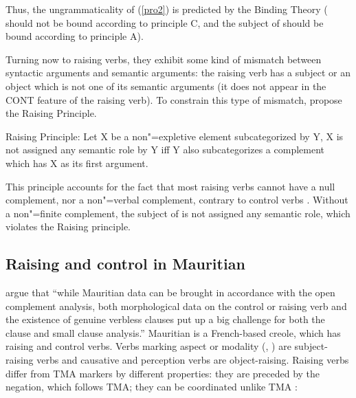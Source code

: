 \documentclass[output=paper
                ,modfonts
                ,nonflat
	        ,collection
	        ,collectionchapter
	        ,collectiontoclongg
 	        ,biblatex
                ,babelshorthands
                ,newtxmath
                ,draftmode
                ,colorlinks, citecolor=brown
]{./langsci/langscibook}
\begin{document}
\eal
{}
\zl

Thus, the ungrammaticality of (\ref{pro2}) is predicted by the Binding Theory ( should not be bound according to principle C, and the subject of  should be bound according to principle A).

Turning now to raising verbs, they exhibit some kind of mismatch between syntactic arguments and
semantic arguments: the raising verb has a subject or an object which is not one of its semantic
arguments (it does not appear in the CONT feature of the raising verb). To constrain this type of
mismatch, \citet[140]{PollardandSag1994} propose the Raising Principle.

\begin{exe}
\ex Raising Principle: Let X be a non"=expletive element subcategorized by Y, X is not assigned any semantic role by Y iff Y also subcategorizes a complement which has X as its first argument.
\end{exe}

This principle accounts for the fact  that most raising verbs cannot have a null complement, nor a non"=verbal complement, contrary to control verbs \citep{Jacobson1990}. Without a non"=finite complement, the subject of  is not assigned any semantic role, which violates the Raising principle.

\eal
{}
\zl


\subsection{Raising and control in Mauritian}

\citet[]{HenriandLaurens2011} argue that ``while Mauritian data can be brought in accordance with the open complement analysis, both morphological data on the control or raising verb and the existence of genuine verbless clauses put up a big challenge for both the clause and small clause analysis.''
Mauritian is a French-based creole, which has raising and control verbs. Verbs marking aspect or
modality (, ) are subject-raising verbs and causative and perception verbs are
object-raising. Raising verbs differ from TMA markers by different properties: they are preceded by
the negation, which follows TMA; they can be coordinated unlike TMA \citep[]{HenriandLaurens2011}:
\end{document}
